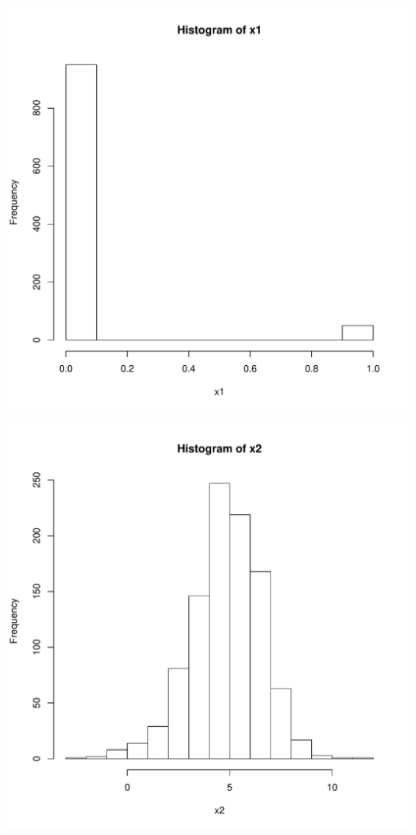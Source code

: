 \documentclass{article}\usepackage[]{graphicx}\usepackage[]{color}
\newenvironment{knitrout}{}{} %
\begin{document}
\begin{knitrout}
\color{fgcolor}
\includegraphics[width=5.5in]{figure/p2a-1} 

\includegraphics[width=5.5in]{figure/p2a-2} 


\end{knitrout}
\end{document}
